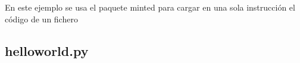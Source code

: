 \documentclass[../main.tex]{subfiles}
\begin{document}
En este ejemplo se usa el paquete minted para cargar en una sola instrucción el código de un fichero
\subsection{hello\textunderscore world.py}
\inputminted[fontsize=\footnotesize]{python}{./codigo/hello_world.py}
\end{document}
